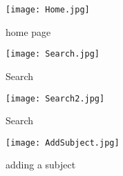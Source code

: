 \documentclass[12pt,a4paper]{article}
\begin{document}
		 
		 
		 
		 
		 
		 
		 
		 \begin{figure}
		 	\texttt{[image: Home.jpg]}
		 	\caption{home page}
		 	\label{fig:home page}
		 \end{figure}
		 
		 \begin{figure}
		 	\texttt{[image: Search.jpg]}
		 	\caption{Search}
		 	\label{fig:Searching for subject}
		 \end{figure}
	 
	 	\begin{figure}
	 		\texttt{[image: Search2.jpg]}
	 		\caption{Search}
	 		\label{fig:Searching for subject continued..}
	 	\end{figure}
 	
 		 \begin{figure}
 			\texttt{[image: AddSubject.jpg]}
 			\caption{adding a subject}
 			\label{fig:Adding a subject or course}
 		\end{figure}
	
\end{document}
